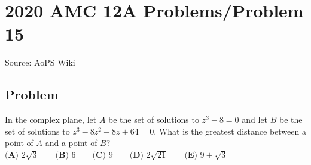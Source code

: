 \documentclass[12pt]{article}
\begin{document}
\section*{{2020 AMC 12A Problems/Problem 15}}
Source: AoPS Wiki

\subsection*{Problem}
In the complex plane, let $A$ be the set of solutions to $z^{3}-8=0$ and let $B$ be the set of solutions to $z^{3}-8z^{2}-8z+64=0.$ What is the greatest distance between a point of $A$ and a point of $B?$ $\textbf{(A) } 2\sqrt{3} \qquad \textbf{(B) } 6 \qquad \textbf{(C) } 9 \qquad \textbf{(D) } 2\sqrt{21} \qquad \textbf{(E) } 9+\sqrt{3}$
\end{document}
